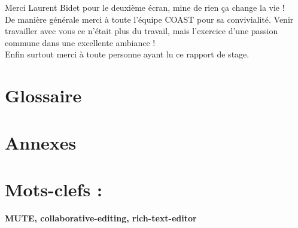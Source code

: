 \documentclass[12pt]{article}
\begin{document}
Merci Laurent Bidet pour le deuxième écran, mine de rien ça change la vie !\\

De manière générale merci à toute l'équipe COAST pour sa convivialité. Venir travailler avec vous ce n'était plus du travail, mais l'exercice d'une passion commune dans une excellente ambiance !\\

Enfin surtout merci à toute personne ayant lu ce rapport de stage.

\newpage
\printbibliography[heading=bibintoc,title={Webographie}]

\newpage
{}
\section*{Glossaire}

\clearpage

\newpage
{}
\section*{Annexes}

\newpage
\section*{Mots-clefs :}
\textbf{MUTE, collaborative-editing, rich-text-editor}
\end{document}
